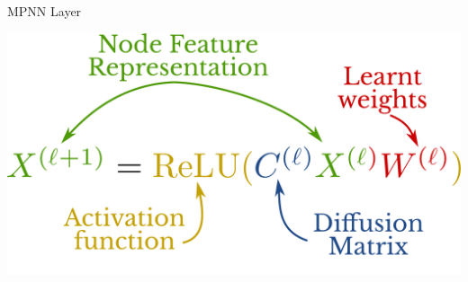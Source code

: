 \documentclass[11pt]{beamer}
\begin{document}
\begin{frame}{MPNN Layer}

  \includegraphics[width=\textwidth]{mpnn_equation}
  
\end{frame}






      
\end{document}

